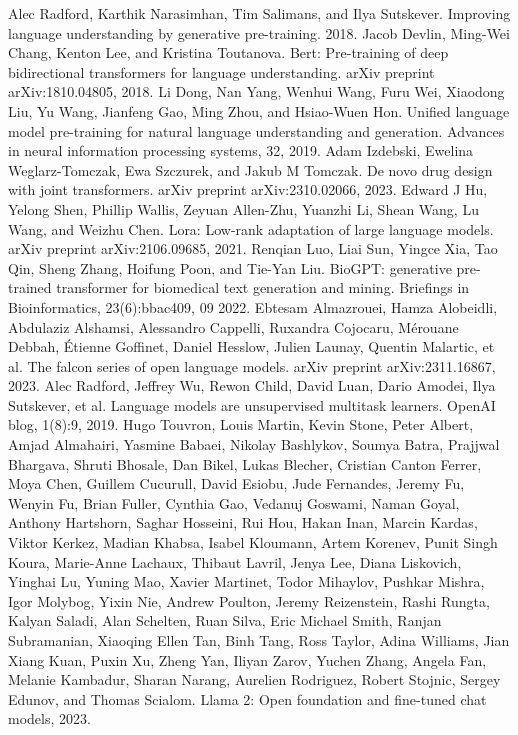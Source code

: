 \begin{chapterreferences}
 Alec Radford, Karthik Narasimhan, Tim Salimans, and Ilya Sutskever. Improving language understanding by generative pre-training. 2018.
 Jacob Devlin, Ming-Wei Chang, Kenton Lee, and Kristina Toutanova. Bert: Pre-training of deep bidirectional transformers for language understanding. arXiv preprint arXiv:1810.04805, 2018.
 Li Dong, Nan Yang, Wenhui Wang, Furu Wei, Xiaodong Liu, Yu Wang, Jianfeng Gao, Ming Zhou, and Hsiao-Wuen Hon. Unified language model pre-training for natural language understanding and generation. Advances in neural information processing systems, 32, 2019.
 Adam Izdebski, Ewelina Weglarz-Tomczak, Ewa Szczurek, and Jakub M Tomczak. De novo drug design with joint transformers. arXiv preprint arXiv:2310.02066, 2023.
 Edward J Hu, Yelong Shen, Phillip Wallis, Zeyuan Allen-Zhu, Yuanzhi Li, Shean Wang, Lu Wang, and Weizhu Chen. Lora: Low-rank adaptation of large language models. arXiv preprint arXiv:2106.09685, 2021.
 Renqian Luo, Liai Sun, Yingce Xia, Tao Qin, Sheng Zhang, Hoifung Poon, and Tie-Yan Liu. BioGPT: generative pre-trained transformer for biomedical text generation and mining. Briefings in Bioinformatics, 23(6):bbac409, 09 2022.
 Ebtesam Almazrouei, Hamza Alobeidli, Abdulaziz Alshamsi, Alessandro Cappelli, Ruxandra Cojocaru, Mérouane Debbah, Étienne Goffinet, Daniel Hesslow, Julien Launay, Quentin Malartic, et al. The falcon series of open language models. arXiv preprint arXiv:2311.16867, 2023.
 Alec Radford, Jeffrey Wu, Rewon Child, David Luan, Dario Amodei, Ilya Sutskever, et al. Language models are unsupervised multitask learners. OpenAI blog, 1(8):9, 2019.
 Hugo Touvron, Louis Martin, Kevin Stone, Peter Albert, Amjad Almahairi, Yasmine Babaei, Nikolay Bashlykov, Soumya Batra, Prajjwal Bhargava, Shruti Bhosale, Dan Bikel, Lukas Blecher, Cristian Canton Ferrer, Moya Chen, Guillem Cucurull, David Esiobu, Jude Fernandes, Jeremy Fu, Wenyin Fu, Brian Fuller, Cynthia Gao, Vedanuj Goswami, Naman Goyal, Anthony Hartshorn, Saghar Hosseini, Rui Hou, Hakan Inan, Marcin Kardas, Viktor Kerkez, Madian Khabsa, Isabel Kloumann, Artem Korenev, Punit Singh Koura, Marie-Anne Lachaux, Thibaut Lavril, Jenya Lee, Diana Liskovich, Yinghai Lu, Yuning Mao, Xavier Martinet, Todor Mihaylov, Pushkar Mishra, Igor Molybog, Yixin Nie, Andrew Poulton, Jeremy Reizenstein, Rashi Rungta, Kalyan Saladi, Alan Schelten, Ruan Silva, Eric Michael Smith, Ranjan Subramanian, Xiaoqing Ellen Tan, Binh Tang, Ross Taylor, Adina Williams, Jian Xiang Kuan, Puxin Xu, Zheng Yan, Iliyan Zarov, Yuchen Zhang, Angela Fan, Melanie Kambadur, Sharan Narang, Aurelien Rodriguez, Robert Stojnic, Sergey Edunov, and Thomas Scialom. Llama 2: Open foundation and fine-tuned chat models, 2023.

\end{chapterreferences}
